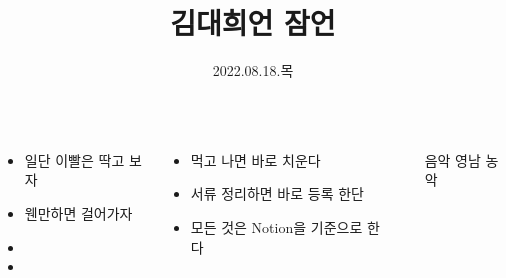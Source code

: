\documentclass[25pt, a1paper ]{tikzposter}
\title{김대희언 잠언 }
\author{ 2022.08.18.목 }
\begin{document}
	\maketitle

	\begin{columns}
			{
			\setlength{\leftmargini}{2em}			
			\setlength{\labelsep}{1em} %
				\begin{LARGE}
					\begin{itemize}
					\item 일단 이빨은  딱고 보자
					\item 웬만하면 걸어가자
					\item 
					\item 
					\end{itemize}
				\end{LARGE}
			}





		{
			\setlength{\leftmargini}{3em}			
			\setlength{\labelsep}{1em} %
			\begin{LARGE}
			\begin{itemize}
			\item 먹고 나면 바로 치운다
			\item 서류 정리하면 바로 등록 한단
			\item 모든 것은 Notion을 기준으로 한다

			\end{itemize}
			\end{LARGE}
		}		


		{
			\setlength{\leftmargini}{7em}			
			\setlength{\labelsep}{1em} %
			\begin{LARGE}
			\begin{itemize}
			\item [음악] 영남 농악
			\end{itemize}
			\end{LARGE}
		}	%







\end{columns}
\end{document}

